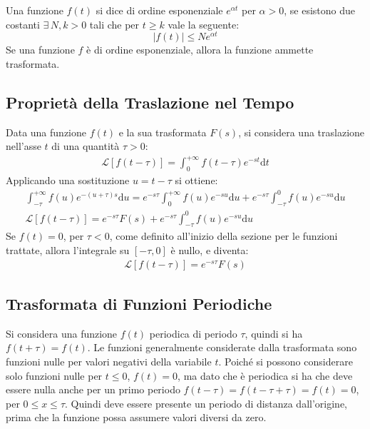 \documentclass{article}
\newcommand{\df}{\mathrm{d}}
\newcommand{\intab}[4]{\displaystyle\int_{#1}^{#2}{#3}\df{#4}}
\newcommand{\intpinf}[2]{\intab{0}{+\infty}{#1}{#2}}
\numberwithin{equation}{subsection}
\begin{document}
Una funzione $f(t)$ si dice di ordine esponenziale $e^{\alpha t}$ per $\alpha>0$, se esistono due costanti $\exists\,N,k>0$ tali che per $t\geq k$ vale la seguente:
\begin{equation}
    |f(t)|\leq Ne^{\alpha t}
\end{equation} 
Se una funzione $f$ è di ordine esponenziale, allora la funzione ammette trasformata. 

\subsection{Proprietà della Traslazione nel Tempo}

Data una funzione $f(t)$ e la sua trasformata $F(s)$, si considera una traslazione nell'asse $t$ di una quantità $\tau>0$:
\begin{gather*}
    \mathcal{L}[f(t-\tau)]=\intpinf{f(t-\tau)e^{-st}}{t}
\end{gather*}
Applicando una sostituzione $u=t-\tau$ si ottiene:
\begin{gather*}
    \int_{-\tau}^{+\infty}{ f(u)e^{-(u+\tau)s}}{\df u}=e^{-s\tau}\intpinf{f(u)e^{-su}}{u}+e^{-s\tau}\int_{-\tau}^0f(u)e^{-su}\df u\\
    \mathcal{L}[f(t-\tau)]=e^{-s\tau}F(s)+e^{-s\tau}\int_{-\tau}^0f(u)e^{-su}\df u
\end{gather*}
Se $f(t)=0$, per $\tau<0$, come definito all'inizio della sezione per le funzioni trattate, allora l'integrale su $[-\tau,0]$ è nullo, e diventa:
\begin{gather}
    \mathcal{L}[f(t-\tau)]=e^{-s\tau}F(s)
\end{gather}

\subsection{Trasformata di Funzioni Periodiche}

Si considera una funzione $f(t)$ periodica di periodo $\tau$, quindi si ha $f(t+\tau)=f(t)$. Le funzioni generalmente considerate dalla trasformata sono funzioni nulle per valori negativi della variabile $t$. 
Poiché si possono considerare solo funzioni nulle per $t\leq 0$, $f(t)=0$, ma dato che è periodica si ha che deve essere nulla anche per un primo periodo $f(t-\tau)=f(t-\tau+\tau)=f(t)=0$, per $0\leq x\leq\tau$. Quindi deve essere presente un periodo di distanza dall'origine, prima che la funzione possa assumere valori diversi da zero. 
\end{document}
